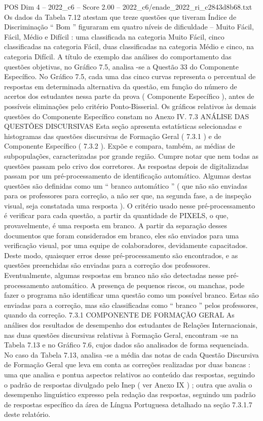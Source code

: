 \begin{textsample}{POS Dim 4 – 2022\_c6 – Score 2.00 – 2022\_c6/enade\_2022\_ri\_c2843d8b68.txt}
Os dados da Tabela 7.12 atestam que treze questões que tiveram Índice de Discriminação “ Bom ” figuraram em quatro níveis de dificuldade – Muito Fácil, Fácil, Médio e Difícil : uma classificada na categoria Muito Fácil, cinco classificadas na categoria Fácil, duas classificadas na categoria Médio e cinco, na categoria Difícil.
A título de exemplo das análises do comportamento das questões objetivas, no Gráfico 7.5, analisa -se a Questão 33 do Componente Específico.
No Gráfico 7.5, cada uma das cinco curvas representa o percentual de respostas em determinada alternativa da questão, em função do número de acertos dos estudantes nessa parte da prova ( Componente Específico ), antes de possíveis eliminações pelo critério Ponto-Bisserial.
Os gráficos relativos às demais questões do Componente Específico constam no Anexo IV. 7.3 ANÁLISE DAS QUESTÕES DISCURSIVAS Esta seção apresenta estatísticas selecionadas e histogramas das questões discursivas de Formação Geral ( 7.3.1 ) e de Componente Específico ( 7.3.2 ).
Expõe e compara, também, as médias de subpopulações, caracterizadas por grande região.
Cumpre notar que nem todas as questões passam pelo crivo dos corretores.
As respostas depois de digitalizadas passam por um pré-processamento de identificação automático.
Algumas destas questões são definidas como um “ branco automático ” ( que não são enviadas para os professores para correção, a não ser que, na segunda fase, a de inspeção visual, seja constatada uma resposta ).
O critério usado nesse pré-processamento é verificar para cada questão, a partir da quantidade de PIXELS, o que, provavelmente, é uma resposta em branco.
A partir da separação desses documentos que foram considerados em branco, eles são enviados para uma verificação visual, por uma equipe de colaboradores, devidamente capacitados.
Deste modo, quaisquer erros desse pré-processamento são encontrados, e as questões preenchidas são enviadas para a correção dos professores.
Eventualmente, algumas respostas em branco não são detectadas nesse pré-processamento automático.
A presença de pequenos riscos, ou manchas, pode fazer o programa não identificar uma questão como um possível branco.
Estas são enviadas para a correção, mas são classificadas como “ branco ” pelos professores, quando da correção. 7.3.1 COMPONENTE DE FORMAÇÃO GERAL As análises dos resultados de desempenho dos estudantes de Relações Internacionais, nas duas questões discursivas relativas à Formação Geral, encontram -se na Tabela 7.13 e no Gráfico 7.6, cujos dados são analisados de forma sequenciada.
No caso da Tabela 7.13, analisa -se a média das notas de cada Questão Discursiva de Formação Geral que leva em conta as correções realizadas por duas bancas : uma que analisa e pontua aspectos relativos ao conteúdo das respostas, seguindo o padrão de respostas divulgado pelo Inep ( ver Anexo IX ) ; outra que avalia o desempenho linguístico expresso pela redação das respostas, seguindo um padrão de respostas específico da área de Língua Portuguesa detalhado na seção 7.3.1.7 deste relatório.

\end{textsample}
